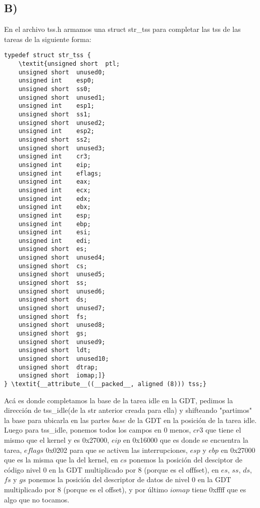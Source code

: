 \subsection*{B)}
En el archivo tss.h armamos una struct str\_tss para completar las tss de las tareas de la siguiente forma:\newline
\begin{codesnippet}
\begin{verbatim}
typedef struct str_tss {
    \textit{unsigned short  ptl;
    unsigned short  unused0;
    unsigned int    esp0;
    unsigned short  ss0;
    unsigned short  unused1;
    unsigned int    esp1;
    unsigned short  ss1;
    unsigned short  unused2;
    unsigned int    esp2;
    unsigned short  ss2;
    unsigned short  unused3;
    unsigned int    cr3;
    unsigned int    eip;
    unsigned int    eflags;
    unsigned int    eax;
    unsigned int    ecx;
    unsigned int    edx;
    unsigned int    ebx;
    unsigned int    esp;
    unsigned int    ebp;
    unsigned int    esi;
    unsigned int    edi;
    unsigned short  es;
    unsigned short  unused4;
    unsigned short  cs;
    unsigned short  unused5;
    unsigned short  ss;
    unsigned short  unused6;
    unsigned short  ds;
    unsigned short  unused7;
    unsigned short  fs;
    unsigned short  unused8;
    unsigned short  gs;
    unsigned short  unused9;
    unsigned short  ldt;
    unsigned short  unused10;
    unsigned short  dtrap;
    unsigned short  iomap;]}
} \textit{__attribute__((__packed__, aligned (8))) tss;}

\end{verbatim}
\end{codesnippet}

Ac\'a es donde completamos la base de la tarea idle en la GDT, pedimos la direcci\'on de tss\_idle(de la str anterior creada para ella) y shifteando "partimos" la base para 
ubicarla en las partes $base$ de la GDT en la posici\'on de la tarea idle.\newline
Luego para tss\_idle, ponemos todos los campos en 0 menos, $cr3$ que tiene el mismo que el kernel y es 0x27000, $eip$ en 0x16000 que es donde se encuentra la tarea, $eflags$ 
0x0202 para que se activen las interrupciones, $esp$ y $ebp$ en 0x27000 que es la misma que la del kernel, en $cs$ ponemos la posici\'on del desciptor de c\'odigo nivel 0 
en la GDT multiplicado por 8 (porque es el offfset), en $es$, $ss$, $ds$, $fs$ y $gs$ ponemos la posici\'on del descriptor de datos de nivel 0 en la GDT multiplicado por 8 
(porque es el offset), y por \'ultimo $iomap$ tiene 0xffff que es algo que no tocamos.\newline

